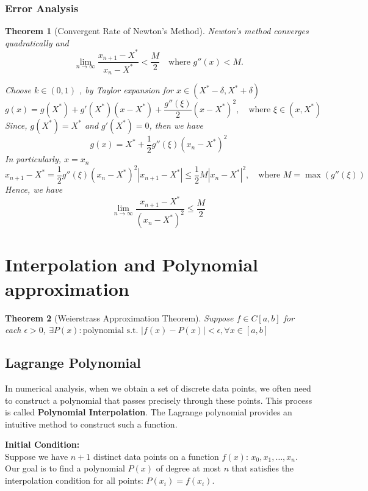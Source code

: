 \documentclass[12pt, a4paper]{article}
\makeatletter
\theoremstyle{break}
\newtheorem{theorem}{Theorem}[section]
\renewenvironment{proof}[1][\proofname]{\par
  \pushQED{\qed}%
  \normalfont \topsep6\p@\@plus6\p@\relax
  \trivlist
  \item[\hskip\labelsep\bfseries #1\@addpunct{.}]\mbox{}\newline\ignorespaces
}{%
  \popQED\endtrivlist\@endpefalse
}
\makeatother
\begin{document}
\subsubsection{Error Analysis}
\begin{theorem}[Convergent Rate of Newton's Method]
Newton's method converges quadratically and 
$$
\lim_{n \rightarrow \infty} \frac{x_{n+1} - X^*}{x_n - X^*} < \frac{M}{2} \quad \text{where } g''(x) < M.
$$

\begin{proof}
Choose $k \in (0, 1)$ , by Taylor expansion for $x \in (X^* - \delta, X^* + \delta)$
$$
g(x) = g(X^*) + g'(X^*)(x - X^*) + \frac{g''(\xi)}{2}(x-X^*)^2, \quad \text{where } \xi \in (x, X^*)
$$
Since, $g(X^*) = X^*$ and $g'(X^*) = 0$, then we have
$$
g(x) = X^* + \frac{1}{2} g''(\xi)(x_n - X^*)^2
$$
In particularly, $x = x_n$
$$
x_{n+1} - X^* = \frac{1}{2} g''(\xi)(x_n - X^*)^2
|x_{n+1} - X^*| \le \frac{1}{2}M|x_n - X^*|^2, \quad \text{where } M = \max(g''(\xi))
$$
Hence, we have
$$
\lim_{n \rightarrow \infty} \frac{x_{n+1} - X^*}{(x_n - X^*)^2} \le \frac{M}{2}
$$
\end{proof}
\end{theorem}

\section{Interpolation and Polynomial approximation}
\begin{theorem}[Weierstrass Approximation Theorem]
  Suppose $f \in C[a, b]$ for each $\epsilon > 0$, $\exists P(x): \text{polynomial s.t. } |f(x) - P(x)| < \epsilon ,\forall x \in [a ,b]$ 
\end{theorem}
\subsection{Lagrange Polynomial}

In numerical analysis, when we obtain a set of discrete data points, we often need to construct a polynomial that passes precisely through these points.
This process is called \textbf{Polynomial Interpolation}. The Lagrange polynomial provides an intuitive method to construct such a function.

\vspace{0.3cm}
\noindent\textbf{Initial Condition:} \\
Suppose we have $n+1$ distinct data points on a function $f(x)$: $x_0, x_1, \dots, x_n$.
\\
Our goal is to find a polynomial $P(x)$ of degree at most $n$ that satisfies the interpolation condition for all points: $P(x_i) = f(x_i)$.
\end{document}

